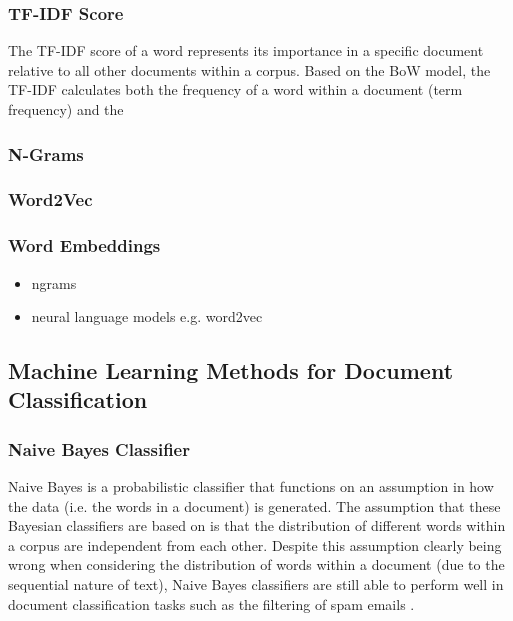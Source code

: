 \documentclass[a4paper,twoside,phd]{BYUPhys}
\begin{document}
\subsubsection{TF-IDF Score}
\label{sec:TFIDF}

The TF-IDF score of a word represents its importance in a specific document relative to all other documents within a corpus. Based on the BoW model, the TF-IDF calculates both the frequency of a word within a document (term frequency) and the 



\subsubsection{N-Grams}
\label{sec:ngrams}

\subsubsection{Word2Vec}
\label{sec:word2vec}

\subsubsection{Word Embeddings}
\label{sec:WordEmbeddings} 

\begin{itemize}
	\item ngrams
	\item neural language models e.g. word2vec 
\end{itemize}

\subsection{Machine Learning Methods for Document Classification}
\label{MLDocumentClassificaiton}

\subsubsection{Naive Bayes Classifier}
\label{sec:NaiveBayes}

Naive Bayes is a probabilistic classifier that functions on an assumption in how the data (i.e. the words in a document) is generated. The assumption that these Bayesian classifiers are based on is that the distribution of different words within a corpus are independent from each other. Despite this assumption clearly being wrong when considering the distribution of words within a document (due to the sequential nature of text), Naive Bayes classifiers are still able to perform well in document classification tasks such as the filtering of spam emails \cite{Sahami}.
\end{document}
